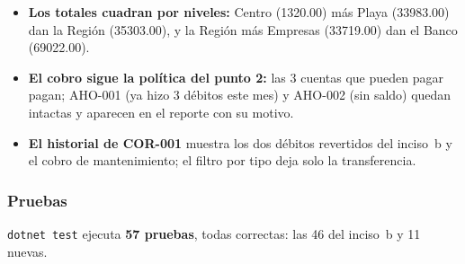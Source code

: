 \begin{itemize}
  \item \textbf{Los totales cuadran por niveles:} Centro (1320.00) más Playa (33983.00) dan
        la Región (35303.00), y la Región más Empresas (33719.00) dan el Banco (69022.00).
  \item \textbf{El cobro sigue la política del punto 2:} las 3 cuentas que pueden pagar
        pagan; AHO-001 (ya hizo 3 débitos este mes) y AHO-002 (sin saldo) quedan intactas y
        aparecen en el reporte con su motivo.
  \item \textbf{El historial de COR-001} muestra los dos débitos revertidos del inciso~b y el
        cobro de mantenimiento; el filtro por tipo deja solo la transferencia.
\end{itemize}

\subsubsection{Pruebas}

\texttt{dotnet test} ejecuta \textbf{57 pruebas}, todas correctas: las 46 del inciso~b y 11
nuevas.

